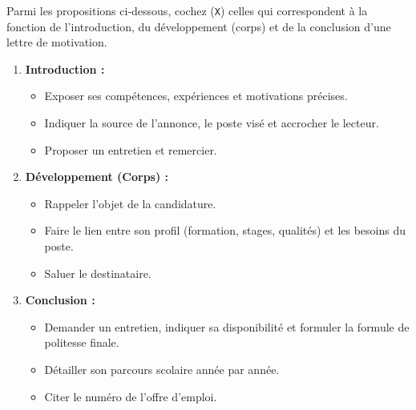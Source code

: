 \documentclass[11pt]{article}
\begin{document}
\begin{exercice}
Parmi les propositions ci-dessous, cochez (\texttt{X}) celles qui correspondent à la fonction de l'introduction, du développement (corps) et de la conclusion d'une lettre de motivation.
\begin{enumerate}
    \item \textbf{Introduction :}
    \begin{itemize}
        \item [ ] Exposer ses compétences, expériences et motivations précises.
        \item [ ] Indiquer la source de l'annonce, le poste visé et accrocher le lecteur.
        \item [ ] Proposer un entretien et remercier.
    \end{itemize}
    \item \textbf{Développement (Corps) :}
    \begin{itemize}
        \item [ ] Rappeler l'objet de la candidature.
        \item [ ] Faire le lien entre son profil (formation, stages, qualités) et les besoins du poste.
        \item [ ] Saluer le destinataire.
    \end{itemize}
    \item \textbf{Conclusion :}
    \begin{itemize}
        \item [ ] Demander un entretien, indiquer sa disponibilité et formuler la formule de politesse finale.
        \item [ ] Détailler son parcours scolaire année par année.
        \item [ ] Citer le numéro de l'offre d'emploi.
    \end{itemize}
\end{enumerate}
\end{exercice}
\end{document}
